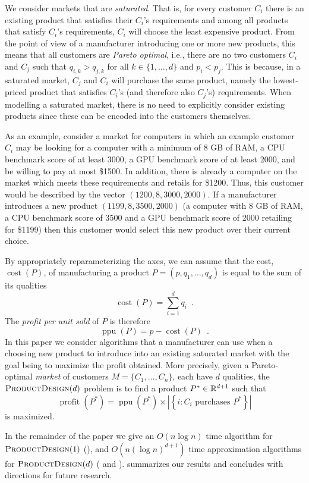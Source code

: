 \documentclass[lotsofwhite]{patmorin}
\newcommand{\cost}{\operatorname{cost}}
\newcommand{\ppu}{\operatorname{ppu}}
\newcommand{\val}{\operatorname{profit}}
\begin{document}
We consider markets that are \emph{saturated}.  That is, for every customer
$C_i$ there is an existing product that satisfies their $C_i$'s
requirements and among all products that satisfy $C_i$'s requirements,
$C_i$ will choose the least expensive product.  From the point of view of a
manufacturer introducing one or more new products, this means that all
customers are \emph{Pareto optimal}, i.e., there are no two customers $C_i$
and $C_j$ such that $q_{i,k} > q_{j,k}$ for all $k\in\{1,\ldots,d\}$ and
$p_i < p_j$.  This is because, in a saturated market, $C_j$ and $C_i$ will
purchase the same product, namely the lowest-priced product that satisfies
$C_i$'s (and therefore also $C_j$'s) requirements.  When modelling a
saturated market, there is no need to explicitly consider existing products
since these can be encoded into the customers themselves.

As an example, consider a market for computers in which an example customer
$C_i$ may be looking for a computer with a minimum of 8 GB of RAM, a CPU
benchmark score of at least 3000, a GPU benchmark score of at least 2000,
and be willing to pay at most \$1500.  In addition, there is already a
computer on the market which meets these requirements and retails for
\$1200.  Thus, this customer would be described by the vector
$(1200,8,3000,2000)$.  If a manufacturer introduces a new product
$(1199,8,3500,2000)$ (a computer with 8 GB of RAM, a CPU benchmark score of
3500 and a GPU benchmark score of 2000 retailing for \$1199) then this
customer would select this new product over their current choice.

By appropriately reparameterizing the axes, we can assume that the cost,
$\cost(P)$, of manufacturing a product $P=(p,q_1,\ldots,q_d)$ is equal to
the sum of its qualities
\[
   \cost(P) = \sum_{i=1}^d q_i \enspace .
\]
The \emph{profit per unit sold} of $P$ is therefore
\[
   \ppu(P) = p-\cost(P) \enspace .
\]
In this paper we consider algorithms that a manufacturer can use when
a choosing new product to introduce into an existing saturated market
with the goal being to maximize the profit obtained.  More precisely,
given a Pareto-optimal \emph{market} of customers $M=\{C_1,\ldots,C_n\}$,
each have $d$ qualities, the $\textsc{ProductDesign}(d)$ problem is to
find a product $P^*\in\mathbb{R}^{d+1}$ such that
\[
  \val(P^*) = \ppu(P^*)
    \times 
      \left| \left\{ i:\mbox{$C_i$ purchases $P^*$} \right\} \right|
\]
is maximized.  

In the remainder of the paper we give an $O(n\log n)$ time algorithm for
$\textsc{ProductDesign}(1)$ (), and $O(n(\log n)^{d+1})$ time
approximation algorithms for $\textsc{ProductDesign}(d)$ (
and ).   summarizes our results and
concludes with directions for future research.
\end{document}
